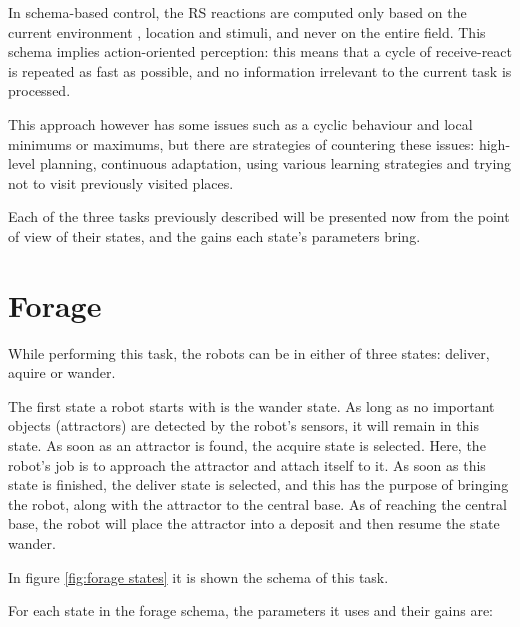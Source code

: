 \documentclass[12pt]{report}
\begin{document}
In schema-based control, the RS reactions are computed only based on the current environment , location and stimuli, and never on the entire field.
This schema implies action-oriented perception: this means that a cycle of receive-react is repeated as fast as possible, and no information irrelevant to the current task is processed. 


This approach however has some issues such as a cyclic behaviour and local minimums or maximums, but there are strategies of countering these issues: high-level planning, continuous adaptation, using various learning strategies and trying not to visit previously visited places.

Each of the three tasks previously described will be presented now from the point of view of their states, and the gains each state's parameters  bring.




\section{Forage}

While performing  this task, the robots can be in either of three states: deliver, aquire or wander.

The first state a robot starts with is the wander state. As long as no important objects (attractors) are detected by the robot's sensors, it will remain in this state. As soon as an attractor is found, the acquire state is selected. Here, the robot's job is to approach the attractor and attach itself to it.
As soon as this state is finished, the deliver state is selected, and this has the purpose of bringing the robot, along with the attractor to the central base. As of reaching the central base, the robot will place the attractor into a deposit and then resume the state wander.


In figure \autoref{fig:forage states} it is shown the schema of this task.

For each state in the forage schema, the parameters it uses and their gains are:
\end{document}

